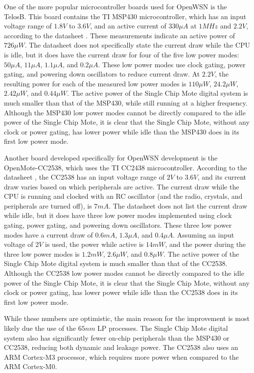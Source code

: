 One of the more popular microcontroller boards used for OpenWSN is the TelosB. This board contains the TI MSP430 microcontroller, which has an input voltage range of $1.8V$ to $3.6V$, and an active current of $330\mu A$ at $1MHz$ and $2.2V$, according to the datasheet \cite{msp430}. These measurements indicate an active power of $726\mu W$. The datasheet does not specifically state the current draw while the CPU is idle, but it does have the current draw for four of the five low power modes: $50\mu A$, $11\mu A$, $1.1\mu A$, and $0.2\mu A$. These low power modes use clock gating, power gating, and powering down oscillators to reduce current draw. At $2.2V$, the resulting power for each of the measured low power modes is $110\mu W$, $24.2\mu W$, $2.42\mu W$, and $0.44\mu W$. The active power of the Single Chip Mote digital system is much smaller than that of the MSP430, while still running at a higher frequency. Although the MSP430 low power modes cannot be directly compared to the idle power of the Single Chip Mote, it is clear that the Single Chip Mote, without any clock or power gating, has lower power while idle than the MSP430 does in its first low power mode.

Another board developed specifically for OpenWSN development is the OpenMote-CC2538, which uses the TI CC2438 microcontroller. According to the datasheet \cite{cc2538}, the CC2538 has an input voltage range of $2V$ to $3.6V$, and its current draw varies based on which peripherals are active. The current draw while the CPU is running and clocked with an RC oscillator (and the radio, crystals, and peripherals are turned off), is $7mA$. The datasheet does not list the current draw while idle, but it does have three low power modes implemented using clock gating, power gating, and powering down oscillators. These three low power modes have a current draw of $0.6mA$, $1.3\mu A$, and $0.4\mu A$. Assuming an input voltage of $2V$ is used, the power while active is $14mW$, and the power during the three low power modes is $1.2mW$, $2.6\mu W$, and $0.8\mu W$. The active power of the Single Chip Mote digital system is much smaller than that of the CC2538. Although the CC2538 low power modes cannot be directly compared to the idle power of the Single Chip Mote, it is clear that the Single Chip Mote, without any clock or power gating, has lower power while idle than the CC2538 does in its first low power mode.

While these numbers are optimistic, the main reason for the improvement is most likely due the use of the $65nm$ LP processes. The Single Chip Mote digital system also has significantly fewer on-chip peripherals than the MSP430 or CC2538, reducing both dynamic and leakage power. The CC2538 also uses an ARM Cortex-M3 processor, which requires more power when compared to the ARM Cortex-M0. 

